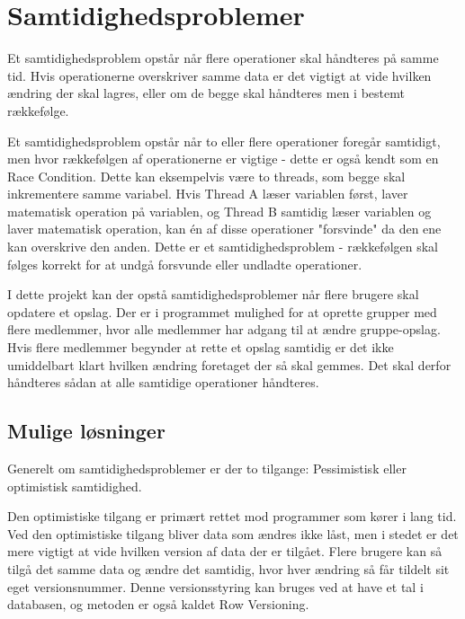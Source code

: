 \chapter{Samtidighedsproblemer}\label{ch:concurrency}
Et samtidighedsproblem opstår når flere operationer skal håndteres på samme tid. Hvis operationerne overskriver samme data er det vigtigt at vide hvilken ændring der skal lagres, eller om de begge skal håndteres men i bestemt rækkefølge.

Et samtidighedsproblem opstår når to eller flere operationer foregår samtidigt, men hvor rækkefølgen af operationerne er vigtige - dette er også kendt som en Race Condition.\cite{racecondition} Dette kan eksempelvis være to threads, som begge skal inkrementere samme variabel. Hvis Thread A læser variablen først, laver matematisk operation på variablen, og Thread B samtidig læser variablen og laver matematisk operation, kan én af disse operationer "forsvinde" da den ene kan overskrive den anden. Dette er et samtidighedsproblem - rækkefølgen skal følges korrekt for at undgå forsvunde eller undladte operationer.

I dette projekt kan der opstå samtidighedsproblemer når flere brugere skal opdatere et opslag. Der er i programmet mulighed for at oprette grupper med flere medlemmer, hvor alle medlemmer har adgang til at ændre gruppe-opslag. Hvis flere medlemmer begynder at rette et opslag samtidig er det ikke umiddelbart klart hvilken ændring foretaget der så skal gemmes. Det skal derfor håndteres sådan at alle samtidige operationer håndteres.


\section{Mulige løsninger}\label{sec:solutions}
Generelt om samtidighedsproblemer er der to tilgange: Pessimistisk eller optimistisk samtidighed. 

Den optimistiske tilgang er primært rettet mod programmer som kører i lang tid. Ved den optimistiske tilgang bliver data som ændres ikke låst, men i stedet er det mere vigtigt at vide hvilken version af data der er tilgået. Flere brugere kan så tilgå det samme data og ændre det samtidig, hvor hver ændring så får tildelt sit eget versionsnummer. Denne versionsstyring kan bruges ved at have et tal i databasen, og metoden er også kaldet Row Versioning\cite{rowversioning}.


